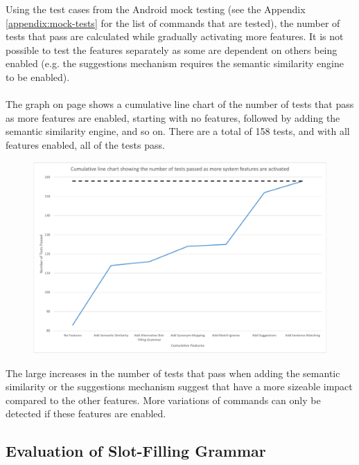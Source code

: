 \documentclass[11pt]{article}
\begin{document}
Using the test cases from the Android mock testing (see the Appendix \ref{appendix:mock-tests} for the list of commands that are tested), the number of tests that pass are calculated while gradually activating more features. It is not possible to test the features separately as some are dependent on others being enabled (e.g. the suggestions mechanism requires the semantic similarity engine to be enabled).
\\
\\
The graph on page \pageref{fig:line-chart-features} shows a cumulative line chart of the number of tests that pass as more features are enabled, starting with no features, followed by adding the semantic similarity engine, and so on. There are a total of 158 tests, and with all features enabled, all of the tests pass.


\begin{center}
\begin{figure}[H]
\begin{center}
  \includegraphics[width=\linewidth]{feature-evaluation.pdf}
  \label{fig:line-chart-features}
  \end{center}
\end{figure}
\end{center}

The large increases in the number of tests that pass when adding the semantic similarity or the suggestions mechanism suggest that have a more sizeable impact compared to the other features. More variations of commands can only be detected if these features are enabled.

\subsection{Evaluation of Slot-Filling Grammar}
\end{document}
